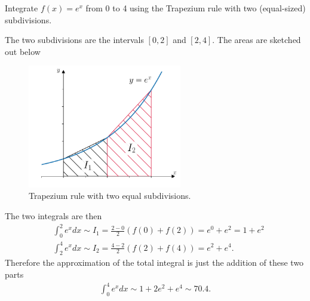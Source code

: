 \exemple{\upline}
{
Integrate $f(x)=e^x$ from 0 to 4 using the Trapezium rule with two (equal-sized) subdivisions.

\noindent The two subdivisions are the intervals $[0,2]$ and $[2,4]$. The areas are sketched out below
\begin{figure}[H]
	\begin{center}
	\includegraphics[width=0.6\textwidth]{figures/ch5_trapezium_example.pdf} 
	  \caption{Trapezium rule with two equal subdivisions.} \label{fig:ch5_trapezium_example}
	\end{center}
\end{figure}
The two integrals are then
\begin{align*}
&\int_0^2 e^x dx \sim I_1 = \frac{2-0}{2} \left(f(0) + f(2) \right) = e^0 + e^2 = 1 + e^2 \\
&\int_2^4 e^x dx \sim I_2 = \frac{4-2}{2} \left(f(2) + f(4) \right) = e^2 + e^4.
\end{align*}
Therefore the approximation of the total integral is just the addition of these two parts
\begin{align*}
\int_0^4 e^x dx \sim 1 + 2e^2 + e^4 \sim 70.4.
\end{align*}
}{\downline}

